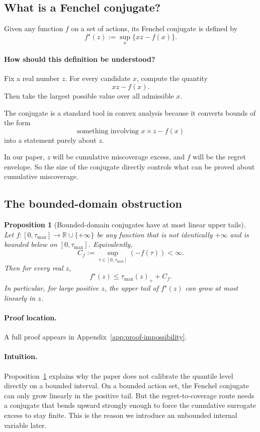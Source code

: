 \documentclass[11pt]{article}
\newtheorem{proposition}{Proposition}
\newcommand{\R}{\mathbb{R}}
\newcommand{\1}{\mathbf{1}}
\begin{document}
\subsection{What is a Fenchel conjugate?}

Given any function $f$ on a set of actions, its Fenchel conjugate is defined by
\[
f^\star(z):=\sup_x\{xz-f(x)\}.
\]

\paragraph{How should this definition be understood?}
Fix a real number $z$. For every candidate $x$, compute the quantity
\[
xz-f(x).
\]
Then take the largest possible value over all admissible $x$.

The conjugate is a standard tool in convex analysis because it converts bounds of the form
\[
\text{something involving }x\times z - f(x)
\]
into a statement purely about $z$.

In our paper, $z$ will be cumulative miscoverage excess, and $f$ will be the regret envelope. So the size of the conjugate directly controls what can be proved about cumulative miscoverage.

\subsection{The bounded-domain obstruction}

\begin{proposition}[Bounded-domain conjugates have at most linear upper tails]
\label{prop:impossibility}
Let $f:[0,\tau_{\max}]\to\R\cup\{+\infty\}$ be any function that is not identically $+\infty$ and is bounded below on $[0,\tau_{\max}]$. Equivalently,
\[
C_f:=\sup_{\tau\in[0,\tau_{\max}]}(-f(\tau))<\infty.
\]
Then for every real $z$,
\[
f^\star(z)\le \tau_{\max}(z)_+ + C_f.
\]
In particular, for large positive $z$, the upper tail of $f^\star(z)$ can grow at most linearly in $z$.
\end{proposition}

\paragraph{Proof location.} A full proof appears in Appendix~\ref{app:proof-impossibility}.


\paragraph{Intuition.} Proposition~\ref{prop:impossibility} explains why the paper does not calibrate the quantile level directly on a bounded interval. On a bounded action set, the Fenchel conjugate can only grow linearly in the positive tail. But the regret-to-coverage route needs a conjugate that bends upward strongly enough to force the cumulative surrogate excess to stay finite. This is the reason we introduce an unbounded internal variable later.
\end{document}

